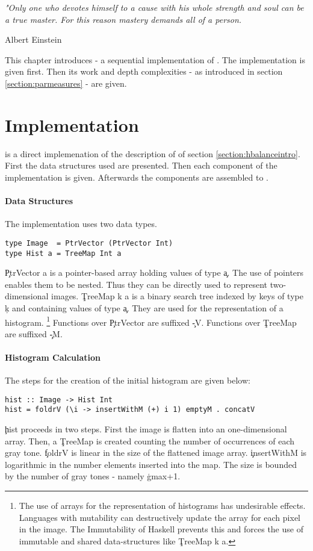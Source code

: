 
\epigraph{
\emph{
"Only one who devotes
himself to a cause with his
whole strength and soul
can be a true master.
For this reason
mastery demands all of a person.
}
}{
Albert Einstein
}

This chapter introduces \seq - a sequential implementation
of \algo. The implementation is given first. Then
its work and depth complexities - as introduced in section \ref{section:parmeasures}
- are given.


\section{Implementation}
  \seq is a direct implemenation of the description of \algo
  of section \ref{section:hbalanceintro}.
  First the data structures used are presented.
  Then each component of the implementation is given. Afterwards
  the components are assembled to \seq.
  
  \paragraph{Data Structures}
    The implementation uses two data types.
    \begin{lstlisting}
type Image  = PtrVector (PtrVector Int)
type Hist a = TreeMap Int a
    \end{lstlisting}
    \c{PtrVector a} is a pointer-based array holding values
    of type \c{a}. The use of pointers enables them to be nested.
    Thus they can be directly used to represent two-dimensional images.
    \c{TreeMap k a} is a binary search tree indexed by keys of type
    \c{k} and containing values of type \c{a}. They are
    used for the representation of a histogram.
    \footnote{The use of arrays for the representation of
    histograms has undesirable effects. Languages with
    mutability can destructively update the array
    for each pixel in the image. The Immutability
    of Haskell prevents this and forces the use of
    immutable and shared data-structures like \c{TreeMap k a}.}
    Functions over \c{PtrVector} are suffixed \c{-V}. Functions over \c{TreeMap} are suffixed \c{-M}.
  
  \paragraph{Histogram Calculation}
    The steps for the creation of the initial histogram are given below:
    \begin{lstlisting}
hist :: Image -> Hist Int
hist = foldrV (\i -> insertWithM (+) i 1) emptyM . concatV
    \end{lstlisting}
    \c{hist} proceeds in two steps. First the image is flatten
    into an one-dimensional array. Then, a \c{TreeMap} is created
    counting the number of occurrences of each gray tone.
    \c{foldrV} is linear in the size of the flattened image array.
    \c{insertWithM} is logarithmic in the number elements
    inserted into the map. The size is bounded by the number of 
    gray tones - namely \c{gmax+1}.
    
